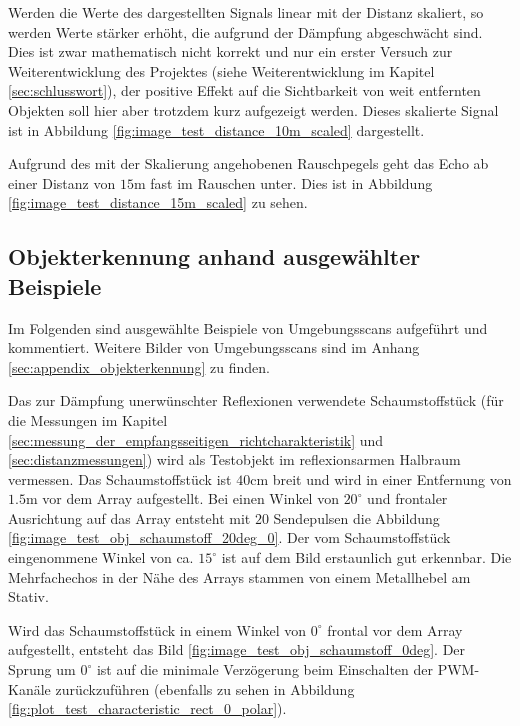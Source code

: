 Werden die Werte des dargestellten Signals linear mit der Distanz skaliert, so werden Werte stärker erhöht, die aufgrund der Dämpfung abgeschwächt sind. Dies ist zwar mathematisch nicht korrekt und nur ein erster Versuch zur Weiterentwicklung des Projektes (siehe Weiterentwicklung im Kapitel \ref{sec:schlusswort}), der positive Effekt auf die Sichtbarkeit von weit entfernten Objekten soll hier aber trotzdem kurz aufgezeigt werden. Dieses skalierte Signal ist in Abbildung \ref{fig:image_test_distance_10m_scaled} dargestellt.

Aufgrund des mit der Skalierung angehobenen Rauschpegels geht das Echo ab einer Distanz von $15 \mathrm{m}$ fast im Rauschen unter. Dies ist in Abbildung \ref{fig:image_test_distance_15m_scaled} zu sehen.

\clearpage
\subsection{Objekterkennung anhand ausgewählter Beispiele}\label{sec:objekterkennung_anhand_ausgewählter_beispiele}
Im Folgenden sind ausgewählte Beispiele von Umgebungsscans aufgeführt und kommentiert. Weitere Bilder von Umgebungsscans sind im Anhang \ref{sec:appendix_objekterkennung} zu finden.

Das zur Dämpfung unerwünschter Reflexionen verwendete Schaumstoffstück (für die Messungen im Kapitel \ref{sec:messung_der_empfangsseitigen_richtcharakteristik} und \ref{sec:distanzmessungen})  wird als Testobjekt im reflexionsarmen Halbraum vermessen. Das Schaumstoffstück ist $40 \mathrm{cm}$ breit und wird in einer Entfernung von $1.5 \mathrm{m}$ vor dem Array aufgestellt. Bei einen Winkel von $20^{\circ}$ und frontaler Ausrichtung auf das Array entsteht mit $20$ Sendepulsen die Abbildung \ref{fig:image_test_obj_schaumstoff_20deg_0}. Der vom Schaumstoffstück eingenommene Winkel von ca. $15^{\circ}$ ist auf dem Bild erstaunlich gut erkennbar.
Die Mehrfachechos in der Nähe des Arrays stammen von einem Metallhebel am Stativ.

Wird das Schaumstoffstück in einem Winkel von $0^{\circ}$ frontal vor dem Array aufgestellt, entsteht das Bild \ref{fig:image_test_obj_schaumstoff_0deg}. Der Sprung um $0^{\circ}$ ist auf die minimale Verzögerung beim Einschalten der PWM-Kanäle zurückzuführen (ebenfalls zu sehen in Abbildung \ref{fig:plot_test_characteristic_rect_0_polar}).

